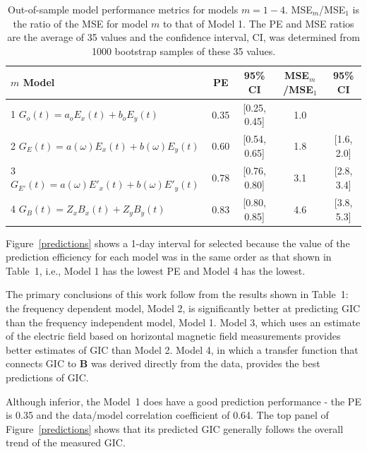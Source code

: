 \documentclass[draft,linenumbers]{agujournal2018}
\begin{document}
\begin{table}
\caption{Out-of-sample model performance metrics for models $m=1-4$. MSE$_m$/MSE$_1$ is the ratio of the MSE for model $m$ to that of Model 1. The PE and MSE ratios are the average of 35 values and the confidence interval, CI, was determined from 1000 bootstrap samples of these 35 values.}
\centering
\begin{tabular}{l c c c c}
\hline
$m$\hspace{1em} Model & PE & 95\% CI & MSE$_m$/MSE$_1$ & 95\% CI\\
\hline
1\hspace{1em} $G_o(t) = a_oE_x(t) + b_oE_y(t)$ & 0.35 & [0.25, 0.45] & 1.0 & \\
2\hspace{1em} $G_E(t) = a(\omega)E_x(t) + b(\omega)E_y(t)$ & 0.60 & [0.54, 0.65] & 1.8 & [1.6, 2.0]\\
3\hspace{1em} $G_{E'}(t) = a(\omega)E'_x(t) + b(\omega)E'_y(t)$ & 0.78 & [0.76, 0.80] & 3.1 & [2.8, 3.4]\\
4\hspace{1em} $G_{B}(t) = Z_xB_x(t) + Z_yB_y(t)$ & 0.83 & [0.80, 0.85] & 4.6 & [3.8, 5.3]\\
\hline
\end{tabular}
\end{table}

Figure~\ref{predictions} shows a 1-day interval for selected because the value of the prediction efficiency for each model was in the same order as that shown in Table~1, i.e., Model 1 has the lowest PE and Model 4 has the lowest.

The primary conclusions of this work follow from the results shown in Table~1: the frequency dependent model, Model 2, is significantly better at predicting GIC than the frequency independent model, Model 1. Model 3, which uses an estimate of the electric field based on horizontal magnetic field measurements provides better estimates of GIC than Model 2. Model 4, in which a transfer function that connects GIC to $\mathbf{B}$ was derived directly from the data, provides the best predictions of GIC. 

Although inferior, the Model~1 does have a good prediction performance - the PE is 0.35 and the data/model correlation coefficient of 0.64. The top panel of  Figure~\ref{predictions} shows that its predicted GIC generally follows the overall trend of the measured GIC. 

\end{document}
